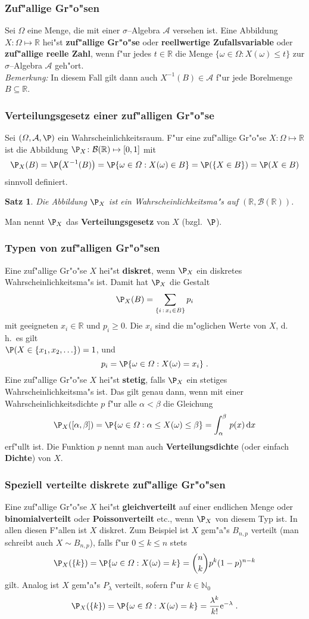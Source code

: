 \documentclass[ngerman,draft,parskip=half,twoside]{scrartcl}
\newtheorem{thm}{Satz}[section]
\newcommand*{\R}{\mathbb{R}}      %
\newcommand*{\N}{\mathbb{N}}      %
\newcommand*{\Algeb}{\mathcal{A}}   %
\newcommand*{\BorelM}{\mathcal{B}}  %
\begin{document}
\subsubsection{Zuf"allige Gr"o"sen}
Sei $\Omega$ eine Menge, die mit einer $\sigma$--Algebra $\Algeb$ versehen ist. Eine Abbildung
$X\colon\Omega\mapsto\R$ hei"st \textbf{zuf"allige Gr"o"se} oder \textbf{reellwertige Zufallsvariable}
oder \textbf{zuf"allige reelle Zahl}, wenn f"ur jedes $t\in\R$ die Menge $\{\omega\in\Omega: X(\omega)\le t\}$
zur $\sigma$--Algebra $\Algeb$ geh"ort.\\
\textit{Bemerkung:} In diesem Fall gilt dann auch $X^{-1}(B)\in\Algeb$ f"ur jede Borelmenge $B\subseteq \R$.

\subsubsection{Verteilungsgesetz einer zuf"alligen Gr"o"se}
Sei $(\Omega,\Algeb,\P)$ ein Wahrscheinlichkeitsraum.
F"ur eine zuf"allige Gr"o"se $X\colon\Omega\mapsto\R$ ist die Abbildung
$\P_X \colon \BorelM(\R)\mapsto [0,1]$ mit
$$
\P_X(B)=\P\big(X^{-1}(B)\big)=\P\{\omega\in\Omega : X(\omega)\in B\}=\P(\{X\in B\})= \P(X\in B)
$$
sinnvoll definiert.
\begin{thm}
Die Abbildung $\P_X$ ist ein Wahrscheinlichkeitsma"s auf $(\R,\BorelM(\R))$.
\end{thm}
Man nennt $\P_X$ das \textbf{Verteilungsgesetz} von $X$ (bzgl.~$\P$).
\subsubsection{Typen von zuf"alligen Gr"o"sen}
Eine zuf"allige Gr"o"se $X$ hei"st \textbf{diskret}, wenn $\P_X$ ein diskretes
Wahrscheinlichkeitsma"s ist. Damit hat $\P_X$ die Gestalt
$$
\P_X(B)=\sum_{\{i\, : \,x_i\in  B\}} p_i
$$
mit geeigneten $x_i\in\R$ und $p_i\ge 0$. Die $x_i$ sind die m"oglichen Werte von $X$, d.\,h.~es
gilt\\ $\P(X\in\{x_1,x_2,\ldots\})=1$,
und
$$
p_i=\P\{\omega\in\Omega : X(\omega)=x_i\}\;.
$$
Eine zuf"allige Gr"o"se $X$ hei"st \textbf{stetig}, falls $\P_X$ ein stetiges Wahrscheinlichkeitsma"s
ist. Das gilt genau dann, wenn mit einer Wahrscheinlichkeitsdichte $p$ f"ur alle $\alpha<\beta$
die Gleichung
$$
\P_X([\alpha,\beta])=\P\{\omega\in\Omega : \alpha\le X(\omega)\le\beta\}=\int_\alpha^\beta\,p(x)\,
\mathrm d x
$$
erf"ullt ist. Die Funktion $p$ nennt man auch \textbf{Verteilungsdichte} (oder einfach
\textbf{Dichte}) von $X$.
\subsubsection{Speziell verteilte diskrete zuf"allige Gr"o"sen}
Eine zuf"allige Gr"o"se $X$ hei"st \textbf{gleichverteilt}
 auf einer endlichen Menge oder \textbf{binomialverteilt}
oder \textbf{Poissonverteilt} etc., wenn $\P_X$ von diesem Typ ist. In allen diesen F"allen
ist $X$ diskret. Zum Beispiel ist $X$ gem"a"s $B_{n,p}$ verteilt (man schreibt auch
$X\sim B_{n,p}$), falls f"ur $0\le k\le n$ stets
$$
\P_X(\{k\})=\P\{\omega\in\Omega : X(\omega)=k\} = {n \choose k} p^k(1-p)^{n-k}
$$
gilt. Analog ist $X$ gem"a"s $P_\lambda$ verteilt, sofern f"ur $k\in\N_0$
$$
\P_X(\{k\})=\P\{\omega\in\Omega : X(\omega)=k\}=\frac{\lambda^k}{k!}\mathrm e^{-\lambda}\;.
$$
\end{document}
